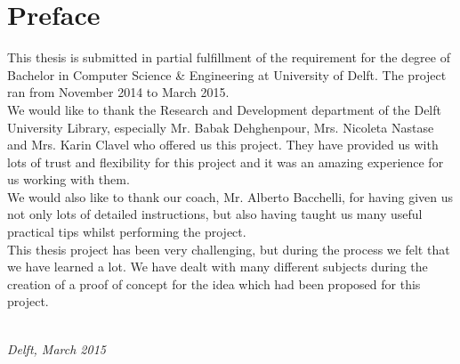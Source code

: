 \chapter*{Preface}

This thesis is submitted in partial fulfillment of the requirement for the degree of Bachelor in Computer Science \& Engineering at University of Delft. 
The project ran from November 2014 to March 2015.\\

We would like to thank the Research and Development department of the Delft University Library, especially Mr. Babak Dehghenpour, Mrs. Nicoleta Nastase 
and Mrs. Karin Clavel who offered us this project. They have provided us with lots of trust and flexibility for this project and it was an amazing 
experience for us working with them.\\

We would also like to thank our coach, Mr. Alberto Bacchelli, for having given us not only lots of detailed instructions, but also having taught us many
useful practical tips whilst performing the project.\\

This thesis project has been very challenging, but during the process we felt that we have learned a lot. We have dealt with many different subjects 
during the creation of a proof of concept for the idea which had been proposed for this project.  


\begin{flushright}
{\makeatletter\itshape
    \@author \\
    Delft, March 2015
\makeatother}
\end{flushright}

